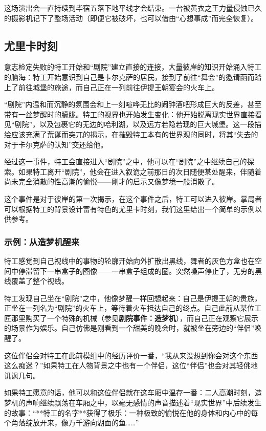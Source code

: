 这场演出会一直持续到毕宿五落下地平线才会结束。一台被黄衣之王力量侵蚀已久的摄影机记下了整场活动（即便它被破坏，也可以借由“心想事成”而完全恢复）。

\subsection{尤里卡时刻}
意志检定失败的特工开始和“剧院”建立直接的连接，大量彼岸的知识开始涌入特工的脑海：特工开始意识到自己是卡尔克萨的居民，接到了前往“舞会”的邀请函而踏上了前往城堡的旅途，而自己正在一列前往伊提王朝宴会的火车上。

“剧院”内温和而沉静的氛围会和上一刻喧哗无比的闹钟酒吧形成巨大的反差，甚至带有一丝梦醒时的朦胧。特工的视界也开始发生变化：他开始脱离现实世界直接看见“剧院”，以及包裹它的无边的哈利湖，以及远方若隐若现的巨大城堡。这一段描绘应该充满了荒诞而突兀的揭示，在摧毁特工本有的世界观的同时，将其“失去的对于卡尔克萨的认知”交还给他。

经过这一事件，特工会直接进入“剧院”之中，他可以在“剧院”之中继续自己的探索。如果特工离开“剧院”，他会在进入叙诡之前那日的次日随便某处醒来，伴随着尚未完全消散的性高潮的愉悦——刚才的启示又像梦境一般消散了。

这个事件是对于彼岸的第一次揭示，在这个事件之后，特工可以进入彼岸。掌局者可以根据特工的背景设计富有特色的尤里卡时刻，我们这里给出一个简单的示例以供参考。

\subsubsection{示例：从造梦机醒来}
特工感觉到自己视线中的事物的轮廓开始向外扩散出黑线，舞者的灰色方盒也在空间中停滞留下一串盒子的图像——一串盒子组成的圈。突然噪声停止了，无穷的黑线覆盖了整个视线。

特工发现自己坐在“剧院”之中，他像梦醒一样回想起来：自己是伊提王朝的贵族，正坐在一列名为“剧院”的火车上，等待着火车抵达自己的终点。自己此前从某位工匠那里购买了一个特殊的机械（参见\textbf{剧院事件：造梦机}），而自己正在观察它展示的场景作为娱乐。自己仿佛是刚看到一个甜美的晚会时，就被坐在旁边的“伴侣”唤醒了。

这位伴侣会对特工在此前模组中的经历评价一番，“我从来没想到你会对这个东西这么痴迷？”如果特工在人物背景之中也有一个伴侣，这位“伴侣”也会对其轻佻地讥讽几句。

如果特工愿意的话，他可以和这位伴侣就在这车厢中温存一番：二人高潮时刻，造梦机的声响继续飘荡在车厢之中，以毫无感情的声音描述着“现实世界”中后续发生的故事：“**特工的名字**获得了极乐：一种极致的愉悦在他的身体和内心中的每个角落绽放开来，像万千游向湖面的鱼……”

